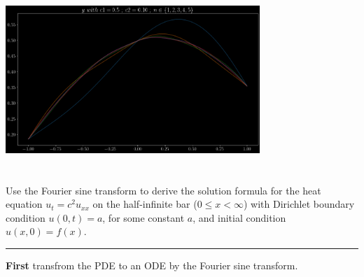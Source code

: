\documentclass[10pt]{article}
\begin{document}
\begin{center}
    \includegraphics[width=0.72\textwidth]{img/2_2.png} \\
\end{center}

\newpage


\section{\underline{}}
\label{sec: Problem 3}

\noindent
Use the Fourier sine transform to derive the solution formula for the heat equation 
$ u_{t} = c^2u_{xx} $ on the half-infinite bar ($ 0 \le x < \infty $) 
with Dirichlet boundary condition $ u(0,t) = a $, for some constant $ a $, 
and initial condition $ u(x,0) = f(x) $. \\
\vspace{2.5mm}

\hrule 

\vspace{7.5mm}

\noindent
\textbf{First} transfrom the PDE to an ODE by the Fourier sine transform. \\
\end{document}
